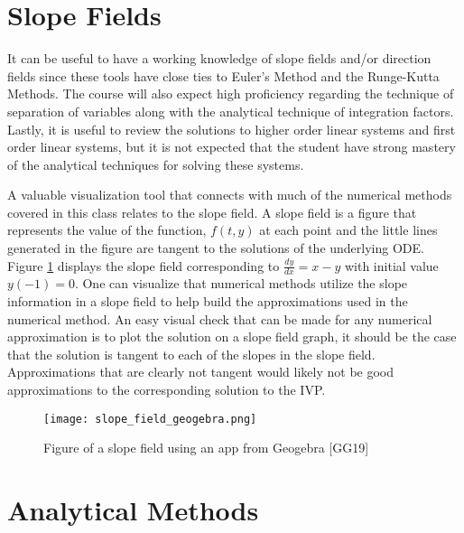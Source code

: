 \documentclass[twoside]{article}
\renewcommand{\cite}[1]{[#1]}
\def\ds{\displaystyle}
\begin{document}
\section{Slope Fields}
It can be useful to have a working knowledge of slope fields and/or direction fields since these tools have close ties to Euler's Method and the Runge-Kutta Methods. The course will also expect high proficiency regarding the technique of separation of variables along with the analytical technique of integration factors. Lastly, it is useful to review the solutions to higher order linear systems and first order linear systems, but it is not expected that the student have strong mastery of the analytical techniques for solving these systems. 
\par \noindent
A valuable visualization tool that connects with much of the numerical methods covered in this class relates to the slope field. A slope field is a figure that represents the value of the function, $f(t,y)$ at each point and the little lines generated in the figure are tangent to the solutions of the underlying ODE. Figure \ref{f:slope_field} displays the slope field corresponding to $\ds \frac {dy}{dx} = x-y$ with initial value $y(-1)=0$. One can visualize that numerical methods utilize the slope information in a slope field to help build the approximations used in the numerical method. An easy visual check that can be made for any numerical approximation is to plot the solution on a slope field graph, it should be the case that the solution is tangent to each of the slopes in the slope field. Approximations that are clearly not tangent would likely not be good approximations to the corresponding solution to the IVP. 


\begin{figure}[!ht]
\centering
\texttt{[image: slope\_field\_geogebra.png]}
 \caption{Figure of a slope field using an app from Geogebra \cite{GG19}}
 \label{f:slope_field}
\end{figure}

\section{Analytical Methods}
\end{document}
